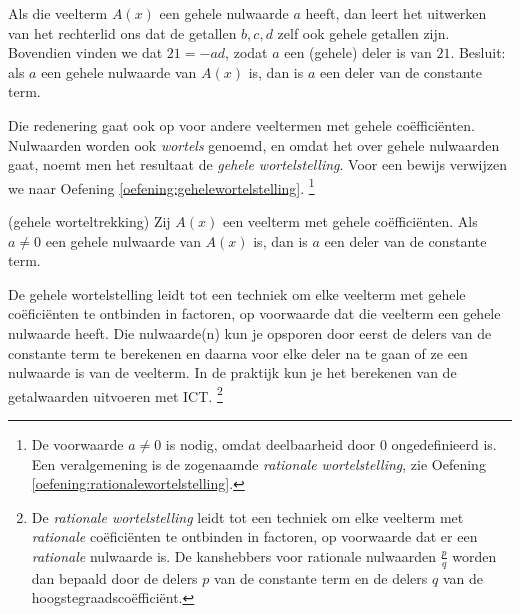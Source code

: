 \documentclass{ximera}
\begin{document}
Als die veelterm $A(x)$ een gehele nulwaarde $a$ heeft, dan leert het uitwerken van het rechterlid ons dat de getallen $b,c,d$ zelf ook gehele getallen zijn. Bovendien vinden we dat $21 = -ad$, zodat $a$ een (gehele) deler is van $21$. Besluit: als $a$ een gehele nulwaarde van $A(x)$ is, dan is $a$ een deler van de constante term. 

Die redenering gaat ook op voor andere veeltermen met gehele coëfficiënten. Nulwaarden worden ook \textit{ wortels} genoemd, en omdat het over gehele nulwaarden gaat, noemt men het resultaat de \textit{ gehele wortelstelling}. Voor een bewijs verwijzen we naar Oefening \ref{oefening:gehelewortelstelling}.
\footnote{De voorwaarde $a \neq 0$ is nodig, omdat deelbaarheid door $0$ ongedefinieerd is.
Een veralgemening is de zogenaamde \textit{ rationale wortelstelling}, zie Oefening \ref{oefening:rationalewortelstelling}.}

\begin{theorem}(gehele worteltrekking)
Zij $A(x)$ een veelterm met gehele coëfficiënten. Als $a \neq 0$ een gehele nulwaarde van $A(x)$ is, dan is $a$ een deler van de constante term. 
\end{theorem} 



De gehele wortelstelling leidt tot een techniek om elke veelterm met gehele coëficiënten te ontbinden in factoren, op voorwaarde dat die veelterm een gehele nulwaarde heeft. Die nulwaarde(n) kun je opsporen door eerst de delers van de constante term te berekenen en daarna voor elke deler na te gaan of ze een nulwaarde is van de veelterm. In de praktijk kun je het berekenen van de getalwaarden uitvoeren met ICT. \footnote{De \textit{ rationale wortelstelling} leidt tot een techniek om elke veelterm met \textit{ rationale} coëficiënten 
te ontbinden in factoren, op voorwaarde dat er een \textit{ rationale} nulwaarde is. De kanshebbers voor rationale nulwaarden $\frac{p}{q}$ worden dan bepaald door de delers $p$ van de constante term en de delers $q$ van de hoogstegraadscoëfficiënt.}
\end{document}
